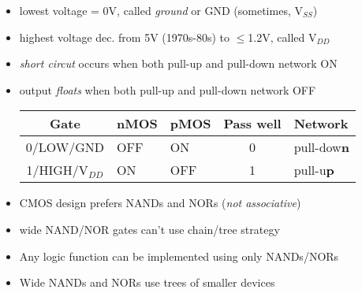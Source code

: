 \begin{itemize}
\item lowest voltage = 0V, called \emph{ground} or GND (sometimes, V$_{SS}$)
\item highest voltage dec. from 5V (1970s-80s) to $\leqslant$1.2V, called V$_{DD}$
\item \emph{short circut} occurs when both pull-up and pull-down network ON
\item output \emph{floats} when both pull-up and pull-down network OFF
\begin{tabular}[h]{cllcl}
  \hline
  Gate & nMOS & pMOS & Pass well & Network  \\
  \hline
  0/LOW/GND & OFF & ON  & 0 &  pull-dow\textbf{n}\\
  1/HIGH/V$_{DD}$ & ON & OFF & 1 & pull-u\textbf{p}\\
  \hline
\end{tabular}
\item CMOS design prefers NANDs and NORs (\emph{not associative})
\item wide NAND/NOR gates can't use chain/tree strategy
\item Any logic function can be implemented using only NANDs/NORs
\item Wide NANDs and NORs use trees of smaller devices
\end{itemize}

\def\normalcoord(#1){coordinate(#1)}
\def\showcoord(#1){coordinate(#1) node[circle, red, draw, inner sep=1pt,
pin={[red, overlay, inner sep=0.5pt, font=\tiny, pin distance=0.1cm,
pin edge={red, overlay}]45:#1}](){}}
\let\coord=\normalcoord
\let\coord=\showcoord %
\def\killdepth#1{{\raisebox{0pt}[\height][0pt]{#1}}} %


